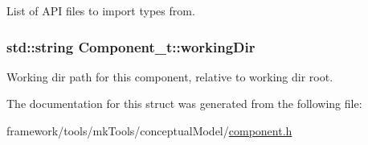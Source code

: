 List of A\+PI files to import types from. 

\subsubsection[{\texorpdfstring{working\+Dir}{workingDir}}]{\setlength{\rightskip}{0pt plus 5cm}std\+::string Component\+\_\+t\+::working\+Dir}\hypertarget{struct_component__t_a016a5e5a867b3d35c33a30fd22c67f3c}{}\label{struct_component__t_a016a5e5a867b3d35c33a30fd22c67f3c}


Working dir path for this component, relative to working dir root. 



The documentation for this struct was generated from the following file\+:\begin{DoxyCompactItemize}
\item 
framework/tools/mk\+Tools/conceptual\+Model/\hyperlink{component_8h}{component.\+h}\end{DoxyCompactItemize}
